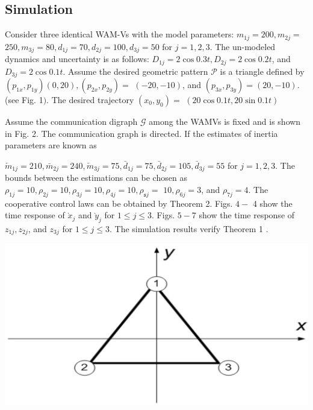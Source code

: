 \documentclass[10pt]{article}
\begin{document}
\subsection{Simulation}
Consider three identical WAM-Vs with the model parameters: $m_{1 j}=200, m_{2 j}=$ $250, m_{3 j}=80, d_{1 j}=70, d_{2 j}=100, d_{3 j}=50$ for $j=1,2,3$. The un-modeled dynamics and uncertainty is as follows: $D_{1 j}=2 \cos 0.3 t, D_{2 j}=2 \cos 0.2 t$, and $D_{3 j}=2 \cos 0.1 t$. Assume the desired geometric pattern $\mathcal{P}$ is a triangle defined by $\left(p_{1 x}, p_{1 y}\right)(0,20),\left(p_{2 x}, p_{2 y}\right)=$ $(-20,-10)$, and $\left(p_{3 x}, p_{3 y}\right)=(20,-10)$. (see Fig. 1$)$. The desired trajectory $\left(x_{0}, y_{0}\right)=$ $(20 \cos 0.1 t, 20 \sin 0.1 t)$

Assume the communication digraph $\mathcal{G}$ among the WAMVs is fixed and is shown in Fig. 2. The communication graph is directed. If the estimates of inertia parameters are known as

$\overleftarrow{m}_{1 j}=210, \bar{m}_{2 j}=240, \overleftarrow{m}_{3 j}=75, \bar{d}_{1 j}=75, \bar{d}_{2 j}=105, \bar{d}_{3 j}=55$ for $j=1,2,3$. The bounds between the estimations can be chosen as $\rho_{1 j}=10, \rho_{2 j}=10, \rho_{3 j}=10, \rho_{4 j}=10, \rho_{\mathfrak{s} j}=$ $10, \rho_{6 j}=3$, and $\rho_{7 j}=4$. The cooperative control laws can be obtained by Theorem 2. Figs. $4-$ 4 show the time response of $\grave{x}_{j}$ and $\grave{y}_{j}$ for $1 \leq j \leq 3$. Figs. $5-7$ show the time response of $z_{1 j}, z_{2 j}$, and $z_{3 j}$ for $1 \leq j \leq 3$. The simulation results verify Theorem 1 .

\begin{center}
\includegraphics[max width=\textwidth]{2023_10_07_53b70c7408bc8e139415g-66(1)}
\end{center}
\end{document}
